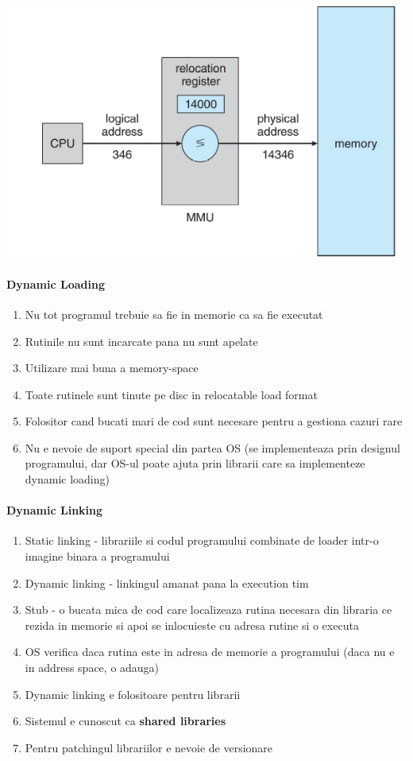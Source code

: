 \documentclass{article}
\begin{document}
\begin{center}
    \includegraphics[scale=0.4]{18_mmu.png}
\end{center}

\paragraph*{Dynamic Loading}
\begin{enumerate}
    \item Nu tot programul trebuie sa fie in memorie ca sa fie executat
    \item Rutinile nu sunt incarcate pana nu sunt apelate
    \item Utilizare mai buna a memory-space
    \item Toate rutinele sunt tinute pe disc in relocatable load format
    \item Folositor cand bucati mari de cod sunt necesare pentru a gestiona cazuri rare
    \item Nu e nevoie de suport special din partea OS (se implementeaza prin designul programului, dar OS-ul poate ajuta prin librarii care sa implementeze dynamic loading)
\end{enumerate}

\paragraph*{Dynamic Linking}
\begin{enumerate}
    \item Static linking - librariile si codul programului combinate de loader intr-o imagine binara a programului
    \item Dynamic linking - linkingul amanat pana la execution tim
    \item Stub - o bucata mica de cod care localizeaza rutina necesara din libraria ce rezida in memorie si apoi se inlocuieste cu adresa rutine si o executa
    \item OS verifica daca rutina este in adresa de memorie a programului (daca nu e in address space, o adauga)
    \item Dynamic linking e folositoare pentru librarii
    \item Sistemul e cunoscut ca \textbf{shared libraries}
    \item Pentru patchingul librariilor e nevoie de versionare
\end{enumerate}
\end{document}
